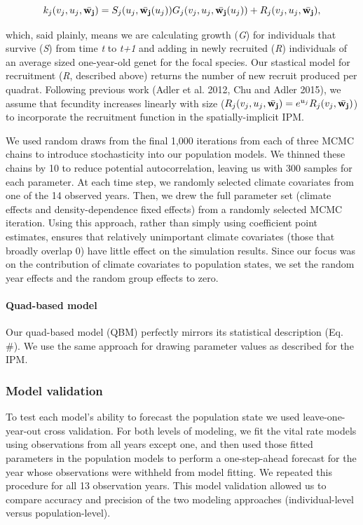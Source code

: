 \documentclass[12pt,]{article}
\begin{document}
\begin{equation}
k_{j}(v_{j},u_{j},\bar{\bold{w_{j}}}) = S_j(u_j, \bar{\bold{w_{j}}}(u_{j}))G_j(v_{j},u_{j},\bar{\bold{w_{j}}}(u_{j})) + R_j(v_{j},u_{j},\bar{\bold{w_{j}}}),
\end{equation}

which, said plainly, means we are calculating growth (\emph{G}) for
individuals that survive (\emph{S}) from time \emph{t} to \emph{t+1} and
adding in newly recruited (\emph{R}) individuals of an average sized
one-year-old genet for the focal species. Our stastical model for
recruitment (\emph{R}, described above) returns the number of new
recruit produced per quadrat. Following previous work (Adler et al.
2012, Chu and Adler 2015), we assume that fecundity increases linearly
with size
(\(R_j(v_{j},u_{j},\bar{\bold{w_{j}}}) = e^{u_j}R_j(v_{j},\bar{\bold{w_{j}}})\))
to incorporate the recruitment function in the spatially-implicit IPM.

We used random draws from the final 1,000 iterations from each of three
MCMC chains to introduce stochasticity into our population models. We
thinned these chains by 10 to reduce potential autocorrelation, leaving
us with 300 samples for each parameter. At each time step, we randomly
selected climate covariates from one of the 14 observed years. Then, we
drew the full parameter set (climate effects and density-dependence
fixed effects) from a randomly selected MCMC iteration. Using this
approach, rather than simply using coefficient point estimates, ensures
that relatively unimportant climate covariates (those that broadly
overlap 0) have little effect on the simulation results. Since our focus
was on the contribution of climate covariates to population states, we
set the random year effects and the random group effects to zero.

\paragraph{Quad-based model}\label{quad-based-model}

Our quad-based model (QBM) perfectly mirrors its statistical description
(Eq. \#). We use the same approach for drawing parameter values as
described for the IPM.

\subsubsection{Model validation}\label{model-validation}

To test each model's ability to forecast the population state we used
leave-one-year-out cross validation. For both levels of modeling, we fit
the vital rate models using observations from all years except one, and
then used those fitted parameters in the population models to perform a
one-step-ahead forecast for the year whose observations were withheld
from model fitting. We repeated this procedure for all 13 observation
years. This model validation allowed us to compare accuracy and
precision of the two modeling approaches (individual-level versus
population-level).
\end{document}
